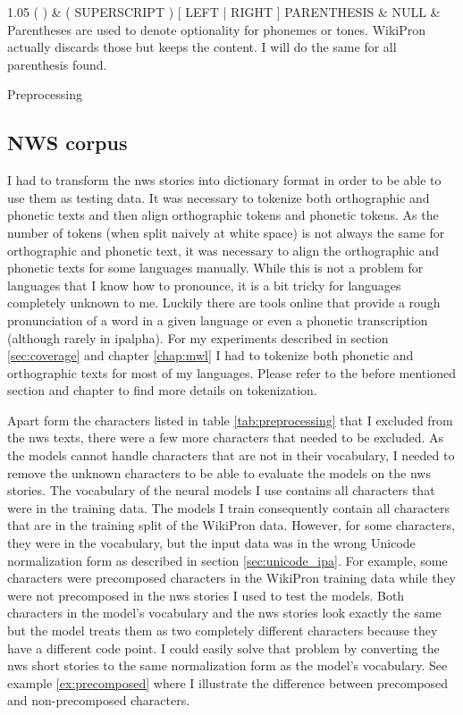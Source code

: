 {\begin{tabularx}{1.05\textwidth}
\hline
( ) 						& \scriptsize{( SUPERSCRIPT ) [ LEFT | RIGHT ] PARENTHESIS}		& NULL							& Parentheses are used to denote optionality for phonemes or tones. WikiPron actually discards those but keeps the content. I will do the same for all parenthesis found.  \\\hline
\end{tabularx}}{Preprocessing}

\subsection*{NWS corpus}
I had to transform the \ac{nws} stories into dictionary format in order to be able to use them as testing data. It was necessary to tokenize both orthographic and phonetic texts and then align orthographic tokens and phonetic tokens. As the number of tokens (when split naively at white space) is not always the same for orthographic and phonetic text, it was necessary to align the orthographic and phonetic texts for some languages manually. While this is not a problem for languages that I know how to pronounce, it is a bit tricky for languages completely unknown to me. Luckily there are tools online that provide a rough pronunciation of a word in a given language or even a phonetic transcription (although rarely in \ac{ipalpha}). For my experiments described in section \ref{sec:coverage} and chapter \ref{chap:mwl} I had to tokenize both phonetic and orthographic texts for most of my languages. Please refer to the before mentioned section and chapter to find more details on tokenization. 

Apart form the characters listed in table \ref{tab:preprocessing} that I excluded from the \ac{nws} texts, there were a few more characters that needed to be excluded. 
As the models cannot handle characters that are not in their vocabulary, I needed to remove the unknown characters to be able to evaluate the models on the \ac{nws} stories. The vocabulary of the neural models I use contains all characters that were in the training data. The models I train consequently contain all characters that are in the training split of the WikiPron data. However, for some characters, they were in the vocabulary, but the input data was in the wrong Unicode normalization form as described in section \ref{sec:unicode_ipa}. For example, some characters were precomposed characters in the WikiPron training data while they were not precomposed in the \ac{nws} stories I used to test the models. Both characters in the model's vocabulary and the \ac{nws} stories look exactly the same but the model treats them as two completely different characters because they have a different code point. I could easily solve that problem by converting the \ac{nws} short stories to the same normalization form as the model's vocabulary. See example \ref{ex:precomposed} where I illustrate the difference between precomposed and non-precomposed characters.


